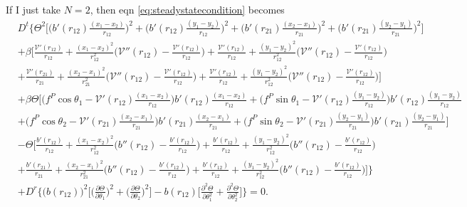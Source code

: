 \documentclass{article}
\begin{document}
If I just take $N=2$, then eqn \ref{eq:steadystatecondition} becomes
\begin{align}
  &D^t\bigg\{\Theta^2\bigg[\bigg(b'(r_{12})\frac{(x_1-x_2)}{r_{12}}\bigg)^2
    +\bigg(b'(r_{12})\frac{(y_1-y_2)}{r_{12}}\bigg)^2
    +\bigg(b'(r_{21})\frac{(x_2-x_1)}{r_{21}}\bigg)^2
    +\bigg(b'(r_{21})\frac{(y_2-y_1)}{r_{21}}\bigg)^2\bigg]\nonumber\\
  &+\beta\bigg[\frac{\mathcal{V}'(r_{12})}{r_{12}}
    +\frac{(x_1-x_2)^2}{r_{12}^2}\bigg(\mathcal{V}''(r_{12})
    -\frac{\mathcal{V}'(r_{12})}{r_{12}}\bigg)
    +\frac{\mathcal{V}'(r_{12})}{r_{12}}
    +\frac{(y_1-y_2)^2}{r_{12}^2}\bigg(\mathcal{V}''(r_{12})
    -\frac{\mathcal{V}'(r_{12})}{r_{12}}\bigg)\nonumber\\
  &+\frac{\mathcal{V}'(r_{21})}{r_{21}}
    +\frac{(x_2-x_1)^2}{r_{21}^2}\bigg(\mathcal{V}''(r_{12})
    -\frac{\mathcal{V}'(r_{12})}{r_{12}}\bigg)
    +\frac{\mathcal{V}'(r_{12})}{r_{12}}
    +\frac{(y_1-y_2)^2}{r_{12}^2}\bigg(\mathcal{V}''(r_{12})
    -\frac{\mathcal{V}'(r_{12})}{r_{12}}\bigg)\bigg]\nonumber\\
  &+\beta \Theta\bigg[
    \bigg(f^P\cos\theta_1-\mathcal{V}'(r_{12})\frac{(x_1-x_2)}{r_{12}}\bigg)
    b'(r_{12})\frac{(x_1-x_2)}{r_{12}}
    +\bigg(f^P\sin\theta_1-\mathcal{V}'(r_{12})\frac{(y_1-y_2)}{r_{12}}\bigg)
    b'(r_{12})\frac{(y_1-y_2)}{r_{12}}\nonumber\\
  &+\bigg(f^P\cos\theta_2-\mathcal{V}'(r_{21})\frac{(x_2-x_1)}{r_{21}}\bigg)
    b'(r_{21})\frac{(x_2-x_1)}{r_{21}}
    +\bigg(f^P\sin\theta_2-\mathcal{V}'(r_{21})\frac{(y_2-y_1)}{r_{21}}\bigg)
    b'(r_{21})\frac{(y_2-y_1)}{r_{21}}\bigg]\nonumber\\
  &-\Theta\bigg[\frac{b'(r_{12})}{r_{12}}
    +\frac{(x_1-x_2)^2}{r_{12}^2}\bigg(b''(r_{12})
    -\frac{b'(r_{12})}{r_{12}}\bigg)
    +\frac{b'(r_{12})}{r_{12}}
    +\frac{(y_1-y_2)^2}{r_{12}^2}\bigg(b''(r_{12})
    -\frac{b'(r_{12})}{r_{12}}\bigg)\nonumber\\
  &+\frac{b'(r_{21})}{r_{21}}
    +\frac{(x_2-x_1)^2}{r_{21}^2}\bigg(b''(r_{12})
    -\frac{b'(r_{12})}{r_{12}}\bigg)
    +\frac{b'(r_{12})}{r_{12}}
    +\frac{(y_1-y_2)^2}{r_{12}^2}\bigg(b''(r_{12})
    -\frac{b'(r_{12})}{r_{12}}\bigg)\bigg]\bigg\}\nonumber\\
  &+D^r\bigg\{\big(b(r_{12})\big)^2\bigg[\bigg(\frac{\partial \Theta}
    {\partial \theta_1}\bigg)^2
    +\bigg(\frac{\partial \Theta}{\partial \theta_2}\bigg)^2\bigg]
    -b(r_{12})\bigg[\frac{\partial^2 \Theta}{\partial \theta_1^2}
    +\frac{\partial^2 \Theta}{\partial \theta_2^2}\bigg]\bigg\}=0.
\end{align}
\end{document}
